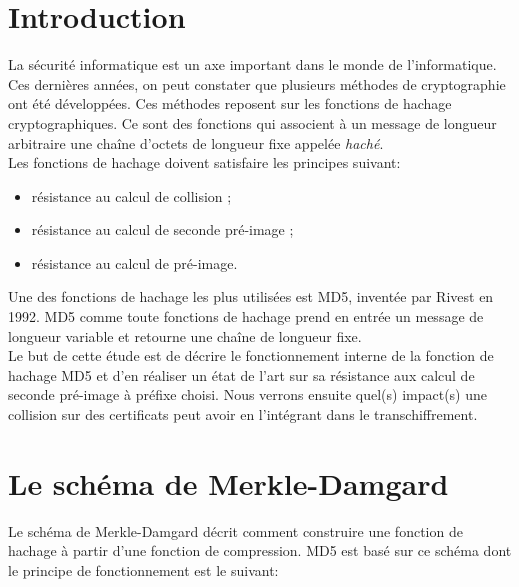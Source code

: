 \section{Introduction}
La sécurité informatique est un axe important dans le monde de l'informatique. Ces dernières années, on peut constater que plusieurs méthodes de cryptographie ont été développées. Ces méthodes reposent sur les fonctions de hachage cryptographiques. Ce sont des fonctions qui associent à un message de longueur arbitraire une chaîne d'octets de longueur fixe appelée {\it{haché}}.\\

Les fonctions de hachage doivent satisfaire les principes suivant:
\begin{itemize}
  \item résistance au calcul de collision ;
  \item résistance au calcul de seconde pré-image ;
  \item résistance au calcul de pré-image.
\end{itemize}
\vspace{.5cm}

Une des fonctions de hachage les plus utilisées est MD5, inventée par Rivest en 1992. MD5 comme toute fonctions de hachage prend en entrée un message de longueur variable et retourne une chaîne de longueur fixe.\\

Le but de cette étude est de décrire le fonctionnement interne de la fonction de hachage MD5 et d'en réaliser un état de l'art sur sa résistance aux calcul de seconde pré-image à préfixe choisi.
Nous verrons ensuite quel(s) impact(s) une collision sur des certificats peut avoir en l'intégrant dans le transchiffrement.

\section{Le schéma de Merkle-Damgard}
Le schéma de Merkle-Damgard décrit comment construire une fonction de hachage à partir d'une fonction de compression. MD5 est basé sur ce schéma dont le principe de fonctionnement est le suivant:\\


